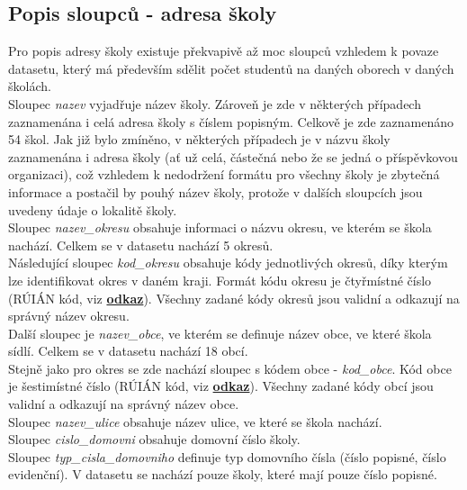 \documentclass[12pt, a4paper]{article}
\begin{document}
\subsection{Popis sloupců - adresa školy}
Pro popis adresy školy existuje překvapivě až moc sloupců vzhledem k povaze datasetu, který má především sdělit počet studentů na daných oborech v daných školách.\\

Sloupec \textit{nazev} vyjadřuje název školy. Zároveň je zde v některých případech zaznamenána i celá adresa školy s číslem popisným. Celkově je zde zaznamenáno 54 škol. Jak již bylo zmíněno, v některých případech je v názvu školy zaznamenána i adresa školy (ať už celá, částečná nebo že se jedná o příspěvkovou organizaci), což vzhledem k nedodržení formátu pro všechny školy je zbytečná informace a postačil by pouhý název školy, protože v dalších sloupcích jsou uvedeny údaje o lokalitě školy. \\

Sloupec \textit{nazev\_okresu} obsahuje informaci o názvu okresu, ve kterém se škola nachází.  Celkem se v datasetu nachází 5 okresů. \\

Následující sloupec \textit{kod\_okresu} obsahuje kódy jednotlivých okresů, díky kterým lze identifikovat okres v daném kraji. Formát kódu okresu je čtyřmístné číslo (RÚIÁN kód, viz \textbf{\href{https://vdp.cuzk.cz/vdp/ruian/okresy/vyhledej}{odkaz}}). Všechny zadané kódy okresů jsou validní a odkazují na správný název okresu.\\

Další sloupec je \textit{nazev\_obce}, ve kterém se definuje název obce, ve které škola sídlí. Celkem se v datasetu nachází 18 obcí. \\

Stejně jako pro okres se zde nachází sloupec s kódem obce - \textit{kod\_obce}. Kód obce je šestimístné číslo (RÚIÁN kód, viz \textbf{\href{https://vdp.cuzk.cz/vdp/ruian/obce/vyhledej}{odkaz}}). Všechny zadané kódy obcí jsou validní a odkazují na správný název obce. \\

Sloupec \textit{nazev\_ulice} obsahuje název ulice, ve které se škola nachází.\\

Sloupec \textit{cislo\_domovni} obsahuje domovní číslo školy. \\

Sloupec \textit{typ\_cisla\_domovniho} definuje typ domovního čísla (číslo popisné, číslo evidenční). V datasetu se nachází pouze školy, které mají pouze číslo popisné. \\
\end{document}
